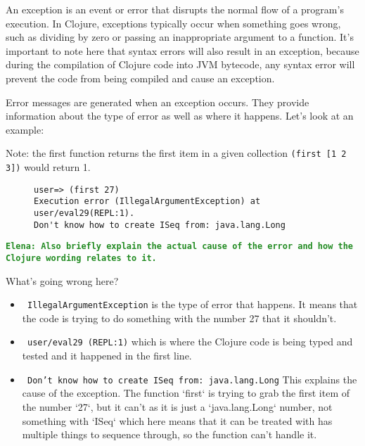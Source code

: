 \documentclass[12pt]{article}
\newcommand{\comment}[1]{{\bf \tt  {#1}}}
\newcommand{\emcomment}[1]{\textcolor{ForestGreen}{\comment{Elena: {#1}}}}
\begin{document}
   An exception is an event or error that disrupts the normal flow of a program’s execution. In Clojure, exceptions typically occur when something goes wrong, such as dividing by 
   zero or passing an inappropriate argument to a function. It’s important to note here that syntax errors will also result in an exception, because during the compilation of Clojure code into JVM bytecode, 
   any syntax error will prevent the code from being compiled and cause an exception.

   Error messages are generated when an exception occurs. They provide information about
   the type of error as well as where it happens. Let’s look at an example:
   
   Note: the first function returns the first item in a given collection
   \texttt{(first [1 2 3])} would return 1.
   

	\begin{figure}[h]
		\centering
		\begin{lstlisting}[breaklines=true, basicstyle=\ttfamily]
user=> (first 27)
Execution error (IllegalArgumentException) at user/eval29(REPL:1).  
Don't know how to create ISeq from: java.lang.Long
		\end{lstlisting}
	\end{figure}
\emcomment{Also briefly explain the actual cause of the error and how the Clojure wording relates to it.}	

What’s going wrong here?
	\begin{itemize}
		\item \texttt{ IllegalArgumentException} is the type of error that happens. It means that the code is trying to do something with the number 27 that it shouldn’t.
		\item \texttt{ user/eval29 (REPL:1)} which is where the Clojure code is being typed and tested and it happened in the first line.
		\item \texttt{ Don't know how to create ISeq from: java.lang.Long} This explains the cause of the exception. The function `first` is trying to grab the first item of the number `27`, 
		but it can’t as it is just a `java.lang.Long` number, not something with `ISeq` which here means that it can be treated with has multiple things to sequence through, so the function can’t handle it.
	\end{itemize}
\end{document}
